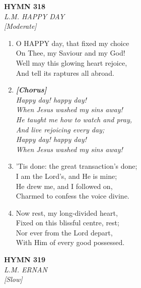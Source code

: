 \newpage
\begin{center}
    {\Large \textbf{HYMN 318}}
    \\
    \textit{L.M. HAPPY DAY}
    \\
    \textit{\small [Moderate]}
\end{center}
\vspace{1em}

\begin{enumerate}
    \item O HAPPY day, that fixed my choice \\
        On Thee, my Saviour and my God! \\
        Well may this glowing heart rejoice, \\
        And tell its raptures all abroad.

    \item[] \vspace{0.4em}
    \textbf{\textit{[Chorus]}} \\
    \textit{Happy day! happy day!} \\
    \textit{When Jesus washed my sins away!} \\
    \textit{He taught me how to watch and pray,} \\
    \textit{And live rejoicing every day;} \\
    \textit{Happy day! happy day!} \\
    \textit{When Jesus washed my sins away!}
    \vspace{0.4em}

    \item 'Tis done: the great transaction's done; \\
        I am the Lord's, and He is mine; \\
        He drew me, and I followed on, \\
        Charmed to confess the voice divine.

    \item Now rest, my long-divided heart, \\
        Fixed on this blissful centre, rest; \\
        Nor ever from the Lord depart, \\
        With Him of every good possessed.

\end{enumerate}

\newpage
\begin{center}
    {\Large \textbf{HYMN 319}}
    \\
    \textit{L.M. ERNAN}
    \\
    \textit{\small [Slow]}
\end{center}
\vspace{1em}

